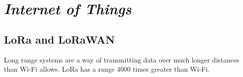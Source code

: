 \section{\emph{Internet of Things}}

\subsection{LoRa and LoRaWAN}

Long range systems are a way of transmitting data over much longer distances than
Wi-Fi allows. LoRa has a range 4000 times greater than Wi-Fi.

